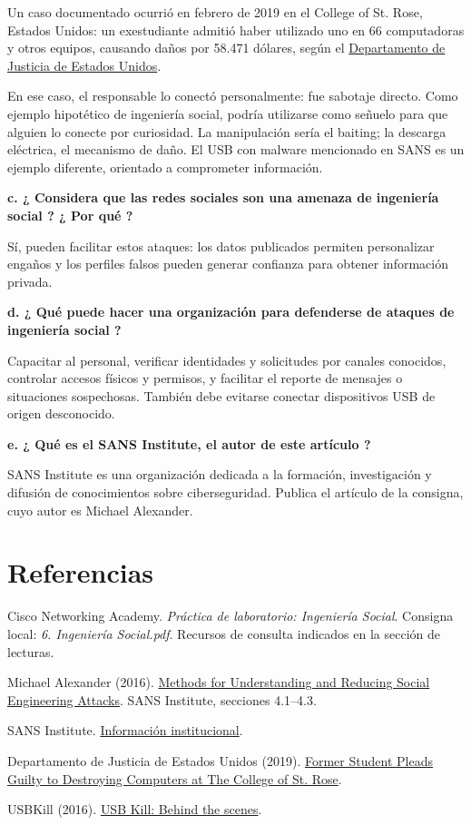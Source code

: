 \documentclass[12pt,a4paper]{article}
\begin{document}
Un caso documentado ocurrió en febrero de 2019 en el College of St. Rose, Estados Unidos: un exestudiante admitió haber utilizado uno en 66 computadoras y otros equipos, causando daños por 58.471 dólares, según el \href{https://www.justice.gov/usao-ndny/pr/former-student-pleads-guilty-destroying-computers-college-st-rose}{Departamento de Justicia de Estados Unidos}.

En ese caso, el responsable lo conectó personalmente: fue sabotaje directo. Como ejemplo hipotético de ingeniería social, podría utilizarse como señuelo para que alguien lo conecte por curiosidad. La manipulación sería el baiting; la descarga eléctrica, el mecanismo de daño. El USB con malware mencionado en SANS es un ejemplo diferente, orientado a comprometer información.

\par\textbf{c. ¿ Considera que las redes sociales son una amenaza de ingeniería social ? ¿ Por qué ?}

Sí, pueden facilitar estos ataques: los datos publicados permiten personalizar engaños y los perfiles falsos pueden generar confianza para obtener información privada.

\par\textbf{d. ¿ Qué puede hacer una organización para defenderse de ataques de ingeniería social ?}

Capacitar al personal, verificar identidades y solicitudes por canales conocidos, controlar accesos físicos y permisos, y facilitar el reporte de mensajes o situaciones sospechosas. También debe evitarse conectar dispositivos USB de origen desconocido.

\par\textbf{e. ¿ Qué es el SANS Institute, el autor de este artículo ?}

SANS Institute es una organización dedicada a la formación, investigación y difusión de conocimientos sobre ciberseguridad. Publica el artículo de la consigna, cuyo autor es Michael Alexander.

\section{Referencias}
Cisco Networking Academy. \textit{Práctica de laboratorio: Ingeniería Social}. Consigna local: \textit{6. Ingeniería Social.pdf}. Recursos de consulta indicados en la sección de lecturas.
\par Michael Alexander (2016). \href{https://www.giac.org/paper/gccc/270/methods-understanding-reducing-social-engineering-attacks/147205}{Methods for Understanding and Reducing Social Engineering Attacks}. SANS Institute, secciones 4.1--4.3.
\par SANS Institute. \href{https://www.sans.org/about}{Información institucional}.
\par Departamento de Justicia de Estados Unidos (2019). \href{https://www.justice.gov/usao-ndny/pr/former-student-pleads-guilty-destroying-computers-college-st-rose}{Former Student Pleads Guilty to Destroying Computers at The College of St. Rose}.
\par USBKill (2016). \href{https://usbkill.com/blogs/news/usb-kill-behind-the-scenes}{USB Kill: Behind the scenes}.
\end{document}
